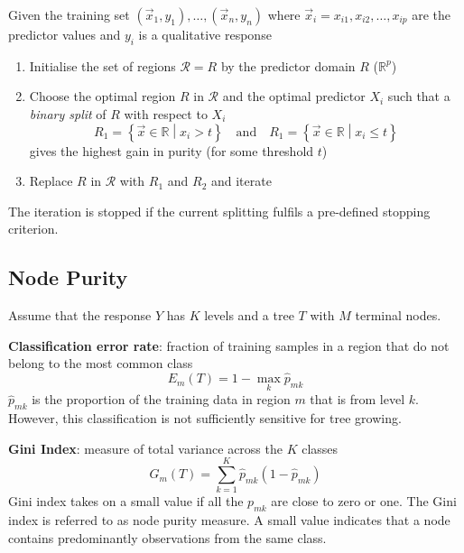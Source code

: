 \documentclass[11pt]{article}
\theoremstyle{definition}
\newcommand*\R{\mathbb{R}}
\begin{document}
\begin{definition}
	Given the training set $(\vec{x}_1,y_1),\dots,(\vec{x}_n,y_n)$ where $\vec{x}_i = x_{i1}, x_{i2}, \dots, x_{ip}$ are the predictor values and $y_i$ is a qualitative response
	\begin{enumerate}
		\item Initialise the set of regions $\mathcal{R} = {R}$ by the predictor domain $R$ ($\R^p$)
		\item Choose the optimal region $R$ in $\mathcal{R}$ and the optimal predictor $X_i$ such that a \emph{binary split} of $R$ with respect to $X_i$
		\begin{equation*}
			R_1 = \left\{ \vec{x} \in \R \middle| x_i > t \right\} \quad\text{and}\quad R_1 = \left\{ \vec{x} \in \R \middle| x_i \leq t \right\}
		\end{equation*}
		gives the highest gain in purity (for some threshold $t$)
		\item Replace $R$ in $\mathcal{R}$ with $R_1$ and $R_2$ and iterate
	\end{enumerate}
	The iteration is stopped if the current splitting fulfils a pre-defined stopping criterion.
\end{definition}

\subsection{Node Purity}
Assume that the response $Y$ has $K$ levels and a tree $T$ with $M$ terminal nodes.

\vspace{1em}
\textbf{Classification error rate}: fraction of training samples in a region that do not belong to the most common class
\begin{equation*}
	E_m(T) = 1 - \max_k \hat{p}_{mk}
\end{equation*}
$\hat{p}_{mk}$ is the proportion of the training data in region $m$ that is from level $k$. However, this classification is not sufficiently sensitive for tree growing.

\vspace{1em}
\textbf{Gini Index}: measure of total variance across the $K$ classes 
\begin{equation*}
	G_m(T) = \sum_{k=1}^{K} \hat{p}_{mk} (1 - \hat{p}_{mk})
\end{equation*}
Gini index takes on a small value if all the $p_{mk}$ are close to zero or one. The Gini index is referred to as node purity measure. A small value indicates that a node contains predominantly observations from the same class.
\end{document}
